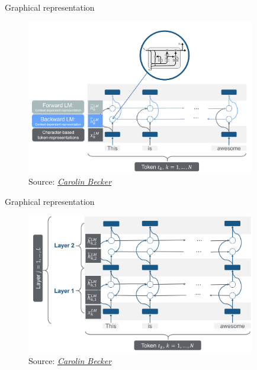 
\begin{vbframe}{Graphical representation}

\vfill

	\begin{figure}
		\centering
		\includegraphics[width = 10cm]{figure/elmo-pretrained-bilm}\\ 
		\footnotesize{Source:} \href{https://slds-lmu.github.io/seminar_nlp_ss20/transfer-learning-for-nlp-i.html}{\footnotesize \it Carolin Becker}
	\end{figure}

\vfill

\end{vbframe}


\begin{vbframe}{Graphical representation}

\vfill
			
	\begin{figure}
		\centering
		\includegraphics[width = 10cm]{figure/elmo-pretrained-bilm-2}\\ 
		\footnotesize{Source:} \href{https://slds-lmu.github.io/seminar_nlp_ss20/transfer-learning-for-nlp-i.html}{\footnotesize \it Carolin Becker}
	\end{figure}

\vfill

\end{vbframe}

